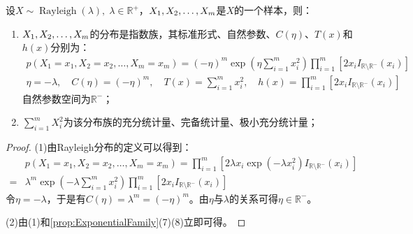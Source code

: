 \begin{theorem}
	设$X\sim\operatorname{Rayleigh}(\lambda),\;\lambda\in\mathbb{R}^{+}$，$X_1, X_2, \dots, X_{m}$是$X$的一个样本，则：
	\begin{enumerate}
		\item $X_1, X_2, \dots, X_{m}$的分布是指数族，其标准形式、自然参数、$C(\eta)$、$T(x)$和$h(x)$分别为：
		\begin{gather*}
			p(X_1=x_1,X_2=x_2,\dots,X_m=x_m) =(-\eta)^m\exp\left(\eta\sum_{i=1}^{m}x_i^2\right)\prod_{i=1}^{m}\left[2x_iI_{\mathbb{R}\setminus\mathbb{R}^{-}}(x_i)\right] \\
			\eta=-\lambda,\quad C(\eta)=(-\eta)^m,\quad
			T(x)=\sum_{i=1}^{m}x_i^2,\quad h(x)=\prod_{i=1}^{m}\left[2x_iI_{\mathbb{R}\setminus\mathbb{R}^{-}}(x_i)\right]
		\end{gather*}
		自然参数空间为$\mathbb{R}^{-}$；
		\item $\sum\limits_{i=1}^{m}X_i^2$为该分布族的充分统计量、完备统计量、极小充分统计量；
	\end{enumerate}
\end{theorem}
\begin{proof}
	(1)由Rayleigh分布的定义可以得到：
	\begin{align*}
		&p(X_1=x_1,X_2=x_2,\dots,X_m=x_m)=\prod_{i=1}^{m}\left[2\lambda x_i\exp(-\lambda x_i^2)I_{\mathbb{R}\setminus\mathbb{R}^{-}}(x_i)\right] \\
		=&\lambda^m\exp\left(-\lambda\sum_{i=1}^{m}x_i^2\right)\prod_{i=1}^{m}\left[2x_iI_{\mathbb{R}\setminus\mathbb{R}^{-}}(x_i)\right]
	\end{align*}
	令$\eta=-\lambda$，于是有$C(\eta)=\lambda^{m}=(-\eta)^m$。由$\eta$与$\lambda$的关系可得$\eta\in\mathbb{R}^{-}$。\par
	(2)由(1)和\cref{prop:ExponentialFamily}(7)(8)立即可得。
\end{proof}

